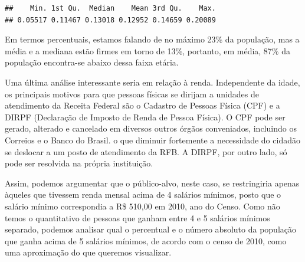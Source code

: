 \documentclass[]{article}
\newenvironment{Shaded}{\begin{snugshade}}{\end{snugshade}}
\newcommand{\KeywordTok}[1]{\textcolor[rgb]{0.13,0.29,0.53}{\textbf{#1}}}
\newcommand{\NormalTok}[1]{#1}
\newcommand{\OperatorTok}[1]{\textcolor[rgb]{0.81,0.36,0.00}{\textbf{#1}}}
\begin{document}
\begin{Shaded}
\end{Shaded}

\begin{verbatim}
##    Min. 1st Qu.  Median    Mean 3rd Qu.    Max. 
## 0.05517 0.11467 0.13018 0.12952 0.14659 0.20089
\end{verbatim}

Em termos percentuais, estamos falando de no máximo 23\% da população,
mas a média e a mediana estão firmes em torno de 13\%, portanto, em
média, 87\% da população encontra-se abaixo dessa faixa etária.

Uma última análise interessante seria em relação à renda. Independente
da idade, os principais motivos para que pessoas físicas se dirijam a
unidades de atendimento da Receita Federal são o Cadastro de Pessoas
Física (CPF) e a DIRPF (Declaração de Imposto de Renda de Pessoa
Física). O CPF pode ser gerado, alterado e cancelado em diversos outros
órgãos conveniados, incluindo os Correios e o Banco do Brasil. o que
diminuir fortemente a necessidade do cidadão se deslocar a um posto de
atendimento da RFB. A DIRPF, por outro lado, só pode ser resolvida na
própria instituição.

Assim, podemos argumentar que o público-alvo, neste caso, se
restringiria apenas àqueles que tivessem renda mensal acima de 4
salários mínimos, posto que o salário mínimo correspondia a R\$ 510,00
em 2010, ano do Censo. Como não temos o quantitativo de pessoas que
ganham entre 4 e 5 salários mínimos separado, podemos analisar qual o
percentual e o número absoluto da população que ganha acima de 5
salários mínimos, de acordo com o censo de 2010, como uma aproximação do
que queremos visualizar.
\end{document}
